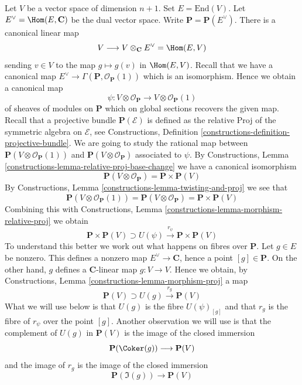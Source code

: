 Let $V$ be a vector space of dimension $n + 1$. Set $E = \text{End}(V)$.
Let $E^\vee = \Hom(E, \mathbf{C})$ be the dual vector space.
Write $\mathbf{P} = \mathbf{P}(E^\vee)$.
There is a canonical linear map
$$
V \longrightarrow V \otimes_\mathbf{C} E^\vee = \Hom(E, V)
$$
sending $v \in V$ to the map $g \mapsto g(v)$ in $\Hom(E, V)$.
Recall that we have a canonical map
$E^\vee \to \Gamma(\mathbf{P}, \mathcal{O}_\mathbf{P}(1))$
which is an isomorphism. Hence we obtain a canonical map
$$
\psi : V \otimes \mathcal{O}_\mathbf{P} \to V \otimes \mathcal{O}_\mathbf{P}(1)
$$
of sheaves of modules on $\mathbf{P}$ which on global sections recovers
the given map. Recall that a projective bundle $\mathbf{P}(\mathcal{E})$
is defined as the relative Proj of the symmetric algebra on $\mathcal{E}$, see
Constructions, Definition \ref{constructions-definition-projective-bundle}.
We are going to study the rational
map between $\mathbf{P}(V \otimes \mathcal{O}_\mathbf{P}(1))$ and
$\mathbf{P}(V \otimes \mathcal{O}_\mathbf{P})$ associated to $\psi$. By
Constructions, Lemma \ref{constructions-lemma-relative-proj-base-change}
we have a canonical isomorphism
$$
\mathbf{P}(V \otimes \mathcal{O}_\mathbf{P}) = \mathbf{P} \times \mathbf{P}(V)
$$
By Constructions, Lemma \ref{constructions-lemma-twisting-and-proj}
we see that
$$
\mathbf{P}(V \otimes \mathcal{O}_\mathbf{P}(1)) =
\mathbf{P}(V \otimes \mathcal{O}_\mathbf{P}) = \mathbf{P} \times \mathbf{P}(V)
$$
Combining this with
Constructions, Lemma \ref{constructions-lemma-morphism-relative-proj}
we obtain
\begin{equation}
\label{equation-r-psi}
\mathbf{P} \times \mathbf{P}(V) \supset
U(\psi) \xrightarrow{r_\psi} \mathbf{P} \times \mathbf{P}(V)
\end{equation}
To understand this better we work out what happens on fibres over
$\mathbf{P}$. Let $g \in E$ be nonzero. This defines a nonzero map
$E^\vee \to \mathbf{C}$, hence a point $[g] \in \mathbf{P}$.
On the other hand, $g$ defines a $\mathbf{C}$-linear map $g : V \to V$.
Hence we obtain, by
Constructions, Lemma \ref{constructions-lemma-morphism-proj}
a map
$$
\mathbf{P}(V) \supset U(g) \xrightarrow{r_g} \mathbf{P}(V)
$$
What we will use below is that $U(g)$ is the fibre $U(\psi)_{[g]}$ and
that $r_g$ is the fibre of $r_\psi$ over the point $[g]$. Another observation
we will use is that the complement of $U(g)$ in $\mathbf{P}(V)$ is
the image of the closed immersion
$$
\mathbf{P}(\Coker(g)) \longrightarrow \mathbf{P}(V)
$$
and the image of $r_g$ is the image of the closed immersion
$$
\mathbf{P}(\Im(g)) \longrightarrow \mathbf{P}(V)
$$

